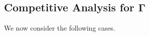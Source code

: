 \documentclass[11pt]{article}
\newcommand{\bigO}{{\cal O}}
\begin{document}
\subsection*{Competitive Analysis for $\mathbf{\Gamma}$}
We now consider the following cases.

\end{document}
